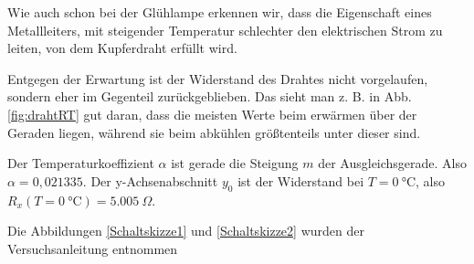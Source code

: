 \documentclass[11pt,a4paper,titlepage, ngerman]{article}
\begin{document}
			Wie auch schon bei der Glühlampe erkennen wir, dass die Eigenschaft eines Metallleiters, mit steigender Temperatur schlechter den elektrischen Strom zu leiten, von dem Kupferdraht erfüllt wird.
			
			Entgegen der Erwartung ist der Widerstand des Drahtes nicht vorgelaufen, sondern eher im Gegenteil zurückgeblieben.
			Das sieht man z. B. in {Abb. \ref{fig:drahtRT}} gut daran, dass die meisten Werte beim erwärmen über der Geraden liegen, während sie beim abkühlen größtenteils unter dieser sind.
			
			Der Temperaturkoeffizient $\alpha$ ist gerade die Steigung $m$ der Ausgleichsgerade.
			Also $\alpha = 0,021335$.
			Der y-Achsenabschnitt $y_0$ ist der Widerstand bei $T=\SI{0}{\celsius}$, also $R_x(T=\SI{0}{\celsius}) = \SI{5,005}{\Omega}$.
		
	\begin{thebibliography}	
		Die Abbildungen \ref{Schaltskizze1} und \ref{Schaltskizze2} wurden der Versuchsanleitung entnommen
	\end{thebibliography}	
			
\end{document}

